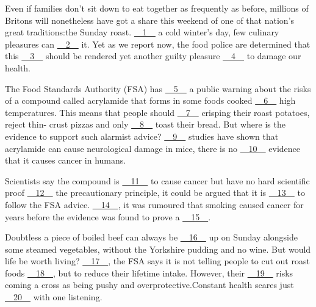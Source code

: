 Even if families don't sit down to eat together as frequently as before, millions of Britons will nonetheless have got a share this weekend of one of that nation's great traditions:the Sunday roast. \uline{~~1~~} a cold winter's day, few culinary pleasures can \uline{~~2~~} it. Yet as we report now, the food police are determined that this \uline{~~3~~} should be rendered yet another guilty pleasure \uline{~~4~~} to damage our health.


The Food Standards Authority (FSA) has \uline{~~5~~} a public warning about the risks of a compound called acrylamide that forms in some foods cooked \uline{~~6~~} high temperatures. This means that people should \uline{~~7~~} crisping their roast potatoes, reject thin- crust pizzas and only \uline{~~8~~} toast their bread. But where is the evidence to support such alarmist advice? \uline{~~9~~} studies have shown that acrylamide can cause neurological damage in mice, there is no \uline{~~10~~} evidence that it causes cancer in humans.


Scientists say the compound is \uline{~~11~~} to cause cancer but have no hard scientific proof \uline{~~12~~} the precautionary principle, it could be argued that it is \uline{~~13~~} to follow the FSA advice. \uline{~~14~~}, it was rumoured that smoking caused cancer for years before the evidence was found to prove a \uline{~~15~~}.


Doubtless a piece of boiled beef can always be \uline{~~16~~} up on Sunday alongside some steamed vegetables, without the Yorkshire pudding and no wine. But would life be worth living? \uline{~~17~~}, the FSA says it is not telling people to cut out roast foods \uline{~~18~~}, but to reduce their lifetime intake. However, their \uline{~~19~~} risks coming a cross as being pushy and overprotective.Constant health scares just \uline{~~20~~} with  one listening.